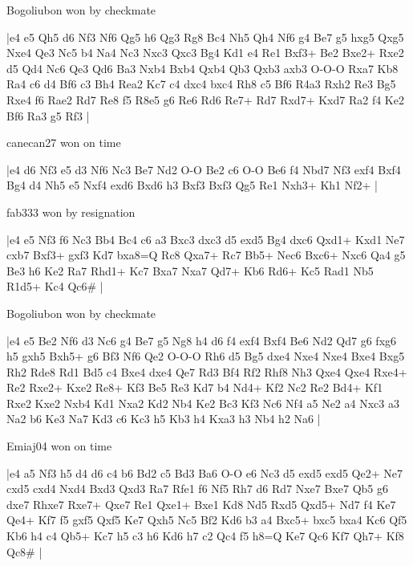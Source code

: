 \showboard

Bogoliubon won by checkmate

\makegametitle
|e4 e5 Qh5 d6 Nf3 Nf6 Qg5 h6 Qg3 Rg8 Bc4 Nh5 Qh4 Nf6 g4 Be7 g5 hxg5 Qxg5 Nxe4 Qe3 Nc5 b4 Na4 Nc3 Nxc3 Qxc3 Bg4 Kd1 e4 Re1 Bxf3+ Be2 Bxe2+ Rxe2 d5 Qd4 Nc6 Qe3 Qd6 Ba3 Nxb4 Bxb4 Qxb4 Qb3 Qxb3 axb3 O-O-O Rxa7 Kb8 Ra4 c6 d4 Bf6 c3 Bh4 Rea2 Kc7 c4 dxc4 bxc4 Rh8 c5 Bf6 R4a3 Rxh2 Re3 Bg5 Rxe4 f6 Rae2 Rd7 Re8 f5 R8e5 g6 Re6 Rd6 Re7+ Rd7 Rxd7+ Kxd7 Ra2 f4 Ke2 Bf6 Ra3 g5 Rf3  |

\showboard

canecan27 won on time

\makegametitle
|e4 d6 Nf3 e5 d3 Nf6 Nc3 Be7 Nd2 O-O Be2 c6 O-O Be6 f4 Nbd7 Nf3 exf4 Bxf4 Bg4 d4 Nh5 e5 Nxf4 exd6 Bxd6 h3 Bxf3 Bxf3 Qg5 Re1 Nxh3+ Kh1 Nf2+  |

\showboard

fab333 won by resignation

\makegametitle
|e4 e5 Nf3 f6 Nc3 Bb4 Bc4 c6 a3 Bxc3 dxc3 d5 exd5 Bg4 dxc6 Qxd1+ Kxd1 Ne7 cxb7 Bxf3+ gxf3 Kd7 bxa8=Q Rc8 Qxa7+ Rc7 Bb5+ Nec6 Bxc6+ Nxc6 Qa4 g5 Be3 h6 Ke2 Ra7 Rhd1+ Kc7 Bxa7 Nxa7 Qd7+ Kb6 Rd6+ Kc5 Rad1 Nb5 R1d5+ Kc4 Qc6\#  |

\showboard

Bogoliubon won by checkmate

\makegametitle
|e4 e5 Be2 Nf6 d3 Nc6 g4 Be7 g5 Ng8 h4 d6 f4 exf4 Bxf4 Be6 Nd2 Qd7 g6 fxg6 h5 gxh5 Bxh5+ g6 Bf3 Nf6 Qe2 O-O-O Rh6 d5 Bg5 dxe4 Nxe4 Nxe4 Bxe4 Bxg5 Rh2 Rde8 Rd1 Bd5 c4 Bxe4 dxe4 Qe7 Rd3 Bf4 Rf2 Rhf8 Nh3 Qxe4 Qxe4 Rxe4+ Re2 Rxe2+ Kxe2 Re8+ Kf3 Be5 Re3 Kd7 b4 Nd4+ Kf2 Nc2 Re2 Bd4+ Kf1 Rxe2 Kxe2 Nxb4 Kd1 Nxa2 Kd2 Nb4 Ke2 Bc3 Kf3 Nc6 Nf4 a5 Ne2 a4 Nxc3 a3 Na2 b6 Ke3 Na7 Kd3 c6 Kc3 h5 Kb3 h4 Kxa3 h3 Nb4 h2 Na6  |

\showboard

Emiaj04 won on time

\makegametitle
|e4 a5 Nf3 h5 d4 d6 c4 b6 Bd2 c5 Bd3 Ba6 O-O e6 Nc3 d5 exd5 exd5 Qe2+ Ne7 cxd5 cxd4 Nxd4 Bxd3 Qxd3 Ra7 Rfe1 f6 Nf5 Rh7 d6 Rd7 Nxe7 Bxe7 Qb5 g6 dxe7 Rhxe7 Rxe7+ Qxe7 Re1 Qxe1+ Bxe1 Kd8 Nd5 Rxd5 Qxd5+ Nd7 f4 Ke7 Qe4+ Kf7 f5 gxf5 Qxf5 Ke7 Qxh5 Nc5 Bf2 Kd6 b3 a4 Bxc5+ bxc5 bxa4 Kc6 Qf5 Kb6 h4 c4 Qb5+ Kc7 h5 c3 h6 Kd6 h7 c2 Qc4 f5 h8=Q Ke7 Qc6 Kf7 Qh7+ Kf8 Qc8\#  |

